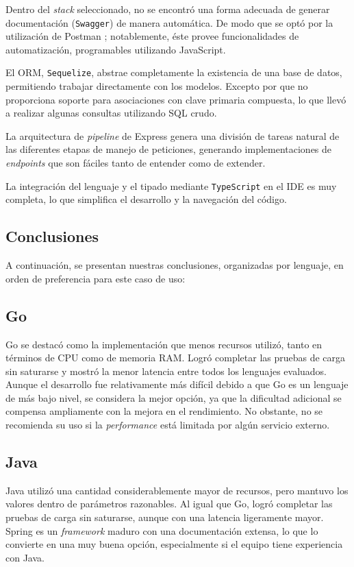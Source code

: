 \documentclass[11pt]{article}
\let\Oldsubsection\subsection
\renewcommand{\subsection}{\FloatBarrier\Oldsubsection}
\newcommand{\english}[1]{\textit{#1}}
\begin{document}
Dentro del \english{stack} seleccionado, no se encontró una forma adecuada de generar documentación (\lstinline{Swagger}) de manera automática. De modo que se optó por la utilización de Postman \cite{js:ex:postman}; notablemente, éste provee funcionalidades de automatización, programables utilizando JavaScript.

El ORM, \lstinline{Sequelize}, abstrae completamente la existencia de una base de datos, permitiendo trabajar directamente con los modelos. Excepto por que no proporciona soporte para asociaciones con clave primaria compuesta, lo que llevó a realizar algunas consultas utilizando SQL crudo.

La arquitectura de \english{pipeline} de Express genera una división de tareas natural de las diferentes etapas de manejo de peticiones, generando implementaciones de \english{endpoints} que son fáciles tanto de entender como de extender.

La integración del lenguaje y el tipado mediante \lstinline{TypeScript} en el IDE es muy completa, lo que simplifica el desarrollo y la navegación del código.

\subsection{Conclusiones}

A continuación, se presentan nuestras conclusiones, organizadas por lenguaje, en orden de preferencia para este caso de uso:

\subsection{Go}
Go se destacó como la implementación que menos recursos utilizó, tanto en términos de CPU como de memoria RAM. Logró completar las pruebas de carga sin saturarse y mostró la menor latencia entre todos los lenguajes evaluados. Aunque el desarrollo fue relativamente más difícil debido a que Go es un lenguaje de más bajo nivel, se considera la mejor opción, ya que la dificultad adicional se compensa ampliamente con la mejora en el rendimiento. No obstante, no se recomienda su uso si la \english{performance} está limitada por algún servicio externo.

\subsection{Java}
Java utilizó una cantidad considerablemente mayor de recursos, pero mantuvo los valores dentro de parámetros razonables. Al igual que Go, logró completar las pruebas de carga sin saturarse, aunque con una latencia ligeramente mayor. Spring es un \textit{framework} maduro con una documentación extensa, lo que lo convierte en una muy buena opción, especialmente si el equipo tiene experiencia con Java.
\end{document}
